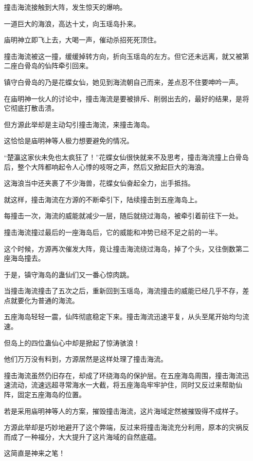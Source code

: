 \begin{this_body}
撞击海流接触到大阵，发生惊天的爆响。

一道巨大的海浪，高达十丈，向玉瑶岛扑来。

庙明神立即飞上去，大喝一声，催动杀招死死顶住。

撞击海流被这一撞，缓缓掉转方向，折向玉瑶岛的左方。但它还未远离，就又被第二座白骨岛的仙阵牵引回来。

镇守白骨岛的乃是花蝶女仙，她见到海流朝自己而来，差点忍不住要呻吟一声。

在庙明神一伙人的讨论中，撞击海流是要被排斥、削弱出去的，最好的结果，是将它彻底打散击溃。

但方源此举却是主动勾引撞击海流，来撞击海岛。

这恰恰是庙明神等人极力想要避免的情况。

“楚瀛这家伙未免也太疯狂了！”花蝶女仙很快就来不及思考，撞击海流撞上白骨岛后，整个大阵都响起令人心悸的吱呀之声，然后又掀起巨大的海浪。

这海浪当中还夹裹了不少海兽，花蝶女仙奋起全力，出手抵挡。

就这样，撞击海流在方源的不断牵引下，陆续撞击到五座海岛上。

每撞击一次，海流的威能就减少一层，随后就绕过海岛，被牵引着前往下一处。

撞击海流撞过最后的一座海岛后，它的威能和冲势已经不足之前的一半。

这个时候，方源再次催发大阵，竟让撞击海流绕过海岛，掉了个头，又往倒数第二座海岛撞去。

于是，镇守海岛的蛊仙们又一番心惊肉跳。

当撞击海流撞击了五次之后，重新回到玉瑶岛，海流撞击的威能已经几乎不存，差点就要化为普通的海流。

五座海岛轻轻一震，仙阵彻底稳定下来。撞击海流迅速平复，从头至尾开始均匀流速。

但岛上的四位蛊仙心中却是掀起了惊涛骇浪！

他们万万没有料到，方源居然是这样处理了撞击海流。

撞击海流虽然仍旧存在，却成了环绕海岛的保护层。在五座海岛周围，撞击海流迅速流动，流速远超寻常海水一大截，将五座海岛牢牢护住，同时又反过来帮助仙阵，固定五座海岛的位置。

若是采用庙明神等人的方案，摧毁撞击海流，这片海域定然被摧毁得不成样子。

方源此举却是巧妙地避开了这个弊端，反过来将撞击海流充分利用，原本的灾祸反而成了一种福分，大大提升了这片海域的自然底蕴。

这简直是神来之笔！


\end{this_body}
